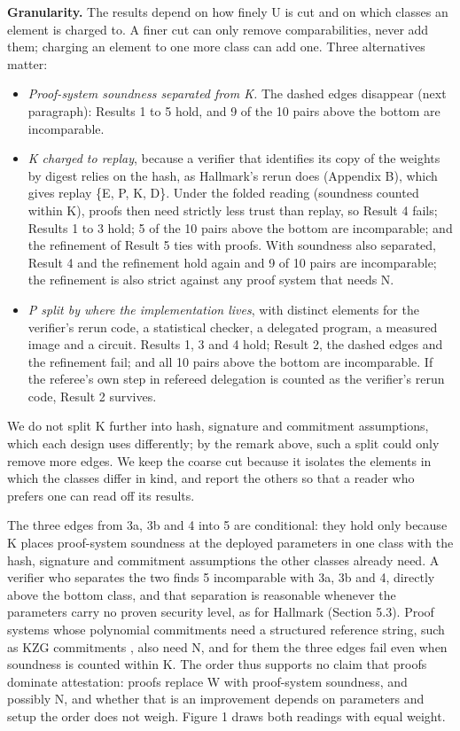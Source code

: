 \documentclass[11pt]{article}
\begin{document}
\textbf{Granularity.} The results depend on how finely U is cut and on which classes an element is charged to. A finer cut can only remove comparabilities, never add them; charging an element to one more class can add one. Three alternatives matter:

\begin{itemize}
\item \emph{Proof-system soundness separated from K.} The dashed edges disappear (next paragraph): Results 1 to 5 hold, and 9 of the 10 pairs above the bottom are incomparable.
\item \emph{K charged to replay}, because a verifier that identifies its copy of the weights by digest relies on the hash, as Hallmark's rerun does (Appendix B), which gives replay \{E, P, K, D\}. Under the folded reading (soundness counted within K), proofs then need strictly less trust than replay, so Result 4 fails; Results 1 to 3 hold; 5 of the 10 pairs above the bottom are incomparable; and the refinement of Result 5 ties with proofs. With soundness also separated, Result 4 and the refinement hold again and 9 of 10 pairs are incomparable; the refinement is also strict against any proof system that needs N.
\item \emph{P split by where the implementation lives}, with distinct elements for the verifier's rerun code, a statistical checker, a delegated program, a measured image and a circuit. Results 1, 3 and 4 hold; Result 2, the dashed edges and the refinement fail; and all 10 pairs above the bottom are incomparable. If the referee's own step in refereed delegation is counted as the verifier's rerun code, Result 2 survives.
\end{itemize}

We do not split K further into hash, signature and commitment assumptions, which each design uses differently; by the remark above, such a split could only remove more edges. We keep the coarse cut because it isolates the elements in which the classes differ in kind, and report the others so that a reader who prefers one can read off its results.

The three edges from 3a, 3b and 4 into 5 are conditional: they hold only because K places proof-system soundness at the deployed parameters in one class with the hash, signature and commitment assumptions the other classes already need. A verifier who separates the two finds 5 incomparable with 3a, 3b and 4, directly above the bottom class, and that separation is reasonable whenever the parameters carry no proven security level, as for Hallmark (Section 5.3). Proof systems whose polynomial commitments need a structured reference string, such as KZG commitments \cite{A41}, also need N, and for them the three edges fail even when soundness is counted within K. The order thus supports no claim that proofs dominate attestation: proofs replace W with proof-system soundness, and possibly N, and whether that is an improvement depends on parameters and setup the order does not weigh. Figure 1 draws both readings with equal weight.
\end{document}
